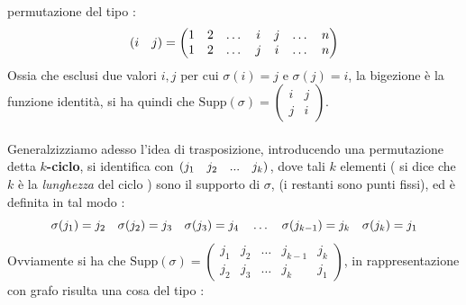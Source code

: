 \documentclass[12pt, letterpaper]{article}
\newcommand{\spaz}{{\text{\hphantom{aa}}}}
\newcommand{\supp}{{\text{Supp}}}
\newcommand{\acc}{\\\hphantom{}\\}
\begin{document}
permutazione del tipo :\begin{equation}
    (i\spaz{ }j)=\begin{pmatrix}
        1 & 2 & \dots&i&j&\dots&n\\
        1 & 2 & \dots&j&i&\dots&n
        \end{pmatrix}
\end{equation}
Ossia che esclusi due valori \(i,j\) per cui \(\sigma(i)=j\) e \(\sigma(j)=i\), la bigezione è la funzione identità, 
si ha quindi che \(\supp(\sigma)=\begin{pmatrix}i&j\\j&i\end{pmatrix}\).\acc 
Generalzizziamo adesso l'idea di trasposizione, introducendo una permutazione detta \(k\)\textbf{-ciclo}, 
si identifica con \((j_1\spaz j_2\spaz...\spaz j_k)\), dove tali \(k\) elementi ( si dice che \(k\) è la \textit{lunghezza} del ciclo ) sono il supporto di \(\sigma\),
(i restanti sono punti fissi), ed è definita in tal modo :\begin{equation}
    \sigma(j_1)=j_2\spaz\sigma(j_2)=j_3\spaz\sigma(j_3)=j_4\spaz\dots\spaz\sigma(j_{k-1})=j_k\spaz \sigma(j_k)=j_1
\end{equation}
Ovviamente si ha che \(\supp(\sigma)=\begin{pmatrix}j_1&j_2&\dots&j_{k-1}&j_k\\j_2&j_3&\dots&j_k&j_1\end{pmatrix}\), in rappresentazione 
con grafo risulta una cosa del tipo :
\begin{figure}[h]
\end{figure}\\
\end{document}
